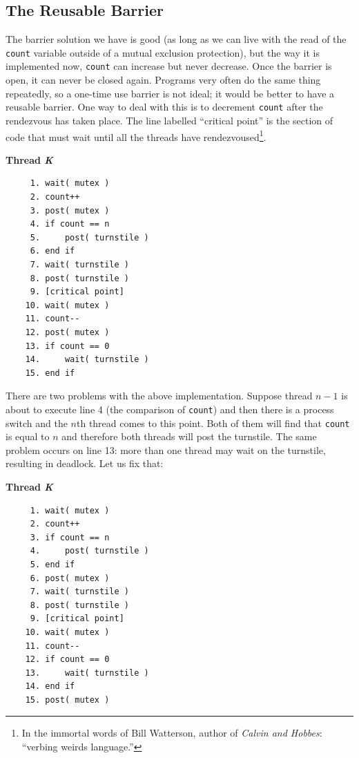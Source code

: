\documentclass[a4paper]{report}
\begin{document}
\subsection*{The Reusable Barrier}
The barrier solution we have is good (as long as we can live with the read of the \texttt{count} variable outside of a mutual exclusion protection), but the way it is implemented now, \texttt{count} can increase but never decrease. Once the barrier is open, it can never be closed again. Programs very often do the same thing repeatedly, so a one-time use barrier is not ideal; it would be better to have a reusable barrier. One way to deal with this is to decrement \texttt{count} after the rendezvous has taken place. The line labelled ``critical point'' is the section of code that must wait until all the threads have rendezvoused\footnote{In the immortal words of Bill Watterson, author of \textit{Calvin and Hobbes}: ``verbing weirds language.''}.


\textbf{Thread \textit{K}}\vspace{-2em}
\begin{verbatim}
	 1. wait( mutex )
	 2. count++
	 3. post( mutex )
	 4. if count == n
	 5.     post( turnstile )
	 6. end if
	 7. wait( turnstile )
	 8. post( turnstile )
	 9. [critical point]
	10. wait( mutex )
	11. count--
	12. post( mutex )
	13. if count == 0
	14.     wait( turnstile )
	15. end if
  \end{verbatim}
\vspace{-2em}

There are two problems with the above implementation. Suppose thread $n-1$ is about to execute line 4 (the comparison of \texttt{count}) and then there is a process switch and the $n$th thread comes to this point. Both of them will find that \texttt{count} is equal to $n$ and therefore both threads will post the turnstile. The same problem occurs on line 13: more than one thread may wait on the turnstile, resulting in deadlock. Let us fix that:


\textbf{Thread \textit{K}}\vspace{-2em}
\begin{verbatim}
	 1. wait( mutex )
	 2. count++
	 3. if count == n
	 4.     post( turnstile )
	 5. end if
	 6. post( mutex )
	 7. wait( turnstile )
	 8. post( turnstile )
	 9. [critical point]
	10. wait( mutex )
	11. count--
	12. if count == 0
	13.     wait( turnstile )
	14. end if
	15. post( mutex )
  \end{verbatim}
\vspace{-2em}
\end{document}
